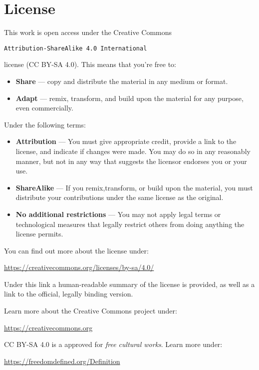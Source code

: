 \chapter*{License}
\thispagestyle{empty}
{\parindent0pt

This work is open access under the Creative Commons

\begin{center}
  \texttt{Attribution-ShareAlike 4.0 International}
\end{center}
license (CC BY-SA 4.0). This means that you're free
to:

\begin{itemize}

\item \textbf{Share} --- copy and distribute the material in any
  medium or format.

\item \textbf{Adapt} --- remix, transform, and build upon the material
  for any purpose, even commercially.

\end{itemize}

Under the following terms:

\begin{itemize}

\item \textbf{Attribution} --- You must give appropriate credit,
  provide a link to the license, and indicate if changes were
  made. You may do so in any reasonably manner, but not in any way
  that suggests the licensor endorses you or your use.

\item \textbf{ShareAlike} --- If you remix,transform, or build upon
  the material, you must distribute your contributions under the same
  license as the original.

  \item \textbf{No additional restrictions} --- You may  not apply
    legal terms or technological measures that legally restrict others
    from doing anything the license permits.

\end{itemize}


You can find out more about the license under:

 \begin{center}
    \url{https://creativecommons.org/licenses/by-sa/4.0/}
 \end{center}

Under this link a human-readable summary of the license is provided,
as well as a link to the official, legally binding version.

Learn more about the Creative Commons project under:

\begin{center}

\url{https://creativecommons.org}
  
\end{center}


CC BY-SA 4.0 is a approved for \emph{free cultural works}. Learn more
under:
\begin{center}
  \url{https://freedomdefined.org/Definition}
\end{center}
}

